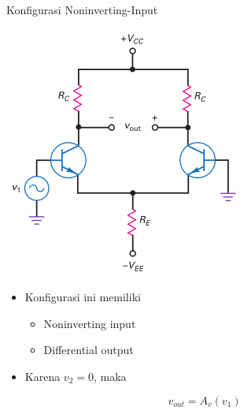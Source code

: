 \documentclass[aspectratio=169]{beamer}
\begin{document}
\begin{frame}{Konfigurasi Noninverting-Input}
	\begin{multicols}{2}
		\begin{center}
			\includegraphics[height=0.7\textheight]{gambar/01.noninverting_input+differential_output}
		\end{center}
		\columnbreak
		\begin{itemize}
			\item Konfigurasi ini memiliki
			\begin{itemize}
				\item Noninverting input
				\item Differential output
			\end{itemize}
			\item Karena $ v_2 = 0 $, maka
		\end{itemize}
		\begin{equation} \label{pers.3}
			v_{out} = A_v (v_1)
		\end{equation}
	\end{multicols}
\end{frame}
\end{document}
